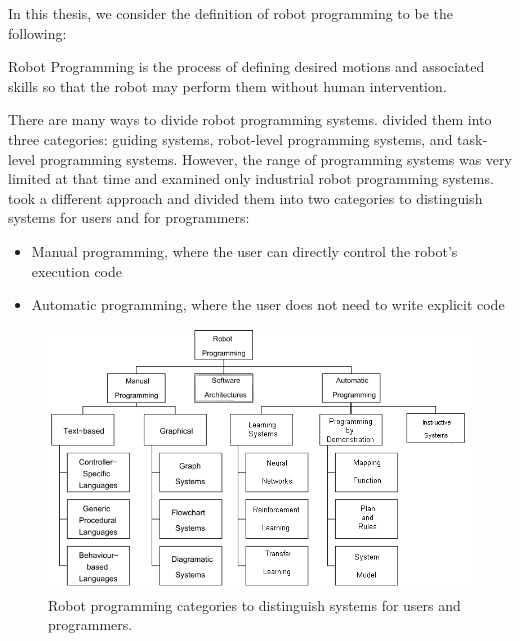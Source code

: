 In this thesis, we consider the definition of robot programming to be the following: 

\theoremstyle{definition}
\begin{definition}{Robot Programming}
is the process of defining desired motions and associated skills so that the robot may perform them without human intervention.
\end{definition}

There are many ways to divide robot programming systems. \cite{lozano1983robot} divided them into three categories: guiding systems, robot-level programming systems, and task-level programming systems. However, the range of programming systems was very limited at that time and examined only industrial robot programming systems.
\cite{Biggs2003} took a different approach and divided them into two categories to distinguish systems for users and for programmers:

\begin{itemize}
  \item Manual programming, where the user can directly control the robot's execution code 
  \item Automatic programming, where the user does not need to write explicit code
\end{itemize}

 \begin{figure}[ht]
 \centering
\includegraphics[width=\linewidth]{figures/Biggs2003-RobotProgramming}
 \caption{Robot programming categories to distinguish systems for users and programmers. \cite{Biggs2003}}
 \label{fig:RobotProgrammingSystems}
\end{figure} 

